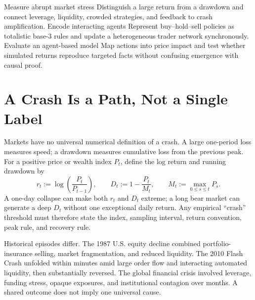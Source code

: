 \documentclass[11pt]{article}
\begin{document}

\learningobjectives
  {Measure abrupt market stress}
  {Distinguish a large return from a drawdown and connect leverage, liquidity, crowded strategies, and feedback to crash amplification.}
  {Encode interacting agents}
  {Represent buy--hold--sell policies as totalistic base-3 rules and update a heterogeneous trader network synchronously.}
  {Evaluate an agent-based model}
  {Map actions into price impact and test whether simulated returns reproduce targeted facts without confusing emergence with causal proof.}

\section{A Crash Is a Path, Not a Single Label}

Markets have no universal numerical definition of a crash. A large one-period loss measures speed; a drawdown measures cumulative loss from the previous peak. For a positive price or wealth index $P_t$, define the log return and running drawdown by
\begin{equation}
  \label{eq:return-drawdown}
  r_t:=\log\!\left(\frac{P_t}{P_{t-1}}\right),
  \qquad
  D_t:=1-\frac{P_t}{M_t},
  \qquad
  M_t:=\max_{0\leq s\leq t}P_s.
\end{equation}
A one-day collapse can make both $r_t$ and $D_t$ extreme; a long bear market can generate a deep $D_t$ without one exceptional daily return. Any empirical ``crash'' threshold must therefore state the index, sampling interval, return convention, peak rule, and recovery rule.

Historical episodes differ. The 1987 U.S. equity decline combined portfolio-insurance selling, market fragmentation, and reduced liquidity. The 2010 Flash Crash unfolded within minutes amid large order flow and interacting automated liquidity, then substantially reversed. The global financial crisis involved leverage, funding stress, opaque exposures, and institutional contagion over months. A shared outcome does not imply one universal cause.
\end{document}
